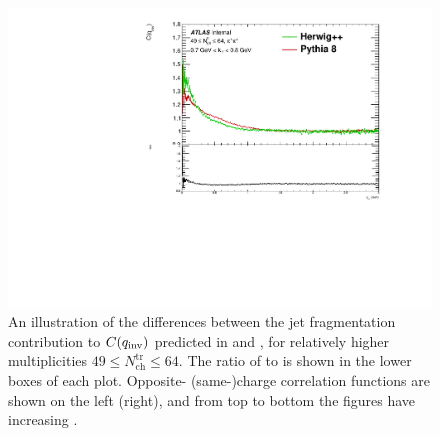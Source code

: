 \begin{figure}[t]
\begin{minipage}[t]{1.0\textwidth}
\includegraphics[width=.49\linewidth]{herwigPythiaCompCent3_e1_kt6.pdf}
\end{minipage}
\caption{An illustration of the differences between the jet fragmentation contribution to $C(q_{\mathrm{inv}})$ predicted in \Herwig and \PYEight, for relatively higher multiplicities $49 \leq N_\mathrm{ch}^\mathrm{tr} \leq 64$. The ratio of \Herwig to \PYEight is shown in the lower boxes of each plot. Opposite- (same-)charge correlation functions are shown on the left (right), and from top to bottom the figures have increasing \kt.}
\label{fig:comp_herwig_pythia_cent3}
\end{figure}

